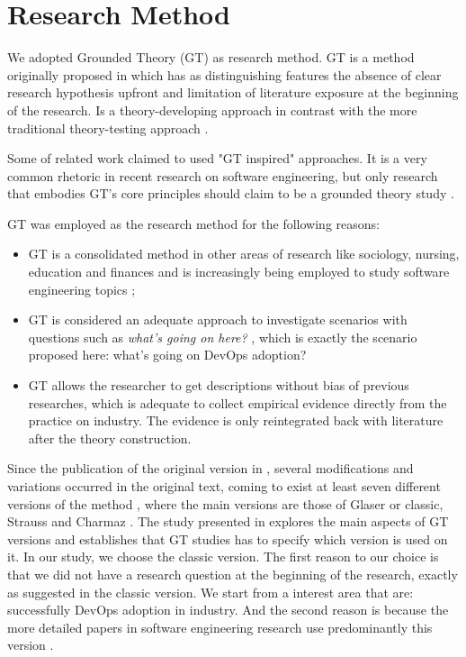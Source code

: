 \section{Research Method} \label{sec:research_method}

We adopted Grounded Theory (GT) as research method. GT is a method originally
proposed in \cite{glase1967discovery} which has as distinguishing features the
absence of clear research hypothesis upfront and limitation of literature
exposure at the beginning of the research. Is a theory-developing approach in
contrast with the more traditional theory-testing approach
\cite{coleman2007using}.

Some of related work claimed to used "GT inspired" approaches. It is a very
common rhetoric in recent research on software engineering, but only research
that embodies GT’s core principles should claim to be a grounded theory study
\cite{stol2016grounded}.

GT was employed as the research method for the following reasons:
\begin{itemize}

\item GT is a consolidated method in other areas of research like sociology,
nursing, education and finances and is increasingly being employed
to study software engineering topics \cite{stol2016grounded};

\item GT is considered an adequate approach to investigate scenarios with
questions such as \textit{what's going on here?} \cite{barnsteiner2002using},
which is exactly the scenario proposed here: what's going on DevOps adoption?

\item GT allows the researcher to get descriptions without bias of previous
researches, which is adequate to collect empirical evidence directly from the
practice on industry. The evidence is only reintegrated back with literature
after the theory construction.

\end{itemize}

Since the publication of the original version in \cite{glase1967discovery},
several modifications and variations occurred in the original text, coming to
exist at least seven different versions of the method \cite{denzin2007grounded},
where the main versions are those of Glaser or classic, Strauss and
Charmaz \cite{stol2016grounded}. The study presented in \cite{stol2016grounded}
explores the main aspects of GT versions and establishes that GT studies has to
specify which version is used on it. In our study, we choose the classic
version. The first reason to our choice is that we did not have a research
question at the beginning of the research, exactly as suggested in the classic
version. We start from a interest area that are: successfully DevOps adoption
in industry. And the second reason is because the more detailed papers in
software engineering research use predominantly this version
\cite{stol2016grounded}.

